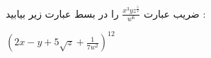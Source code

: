 ضریب عبارت
$\frac{x^3 y z^{\frac{5}{2}}}{w^6}$
را در بسط عبارت زیر بیابید :
\begin{center}
  $(2x - y + 5\sqrt{z} + \frac{1}{7w^2})^{12}$
\end{center}